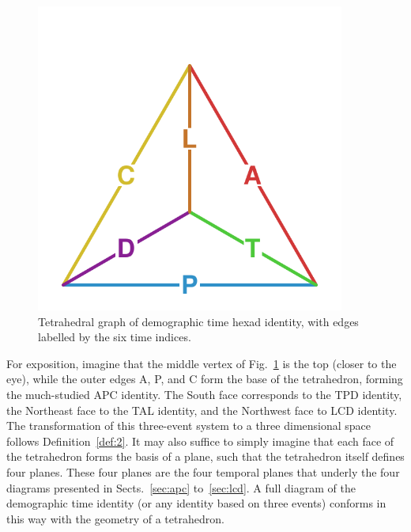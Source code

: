 \documentclass[12pt,oneside,a4paper]{article} %
\theoremstyle{definition}
\begin{document}
\begin{figure}[h!]
\centering
\caption{Tetrahedral graph of demographic time hexad identity, with edges
labelled by the six time indices.}
\label{fig:tet}
\includegraphics[width=4in]{Figures/TetraHedronEdgesOnly.pdf}%
\end{figure}

For exposition, imagine that the middle vertex of Fig.~\ref{fig:tet} is the
top (closer to the eye), while the outer edges A, P, and C form the
base of the tetrahedron, forming the much-studied APC identity.
The South face corresponds to the TPD identity,
the Northeast face to the TAL identity, and the
Northwest face to LCD identity. The transformation of this three-event
system to a three dimensional space follows Definition~\ref{def:2}.
It may also suffice to simply imagine that each face of the tetrahedron forms
the basis of a plane, such that the tetrahedron itself defines four planes. These four planes are the four temporal planes that underly
the four diagrams presented in Sects.~\ref{sec:apc} to~\ref{sec:lcd}. A full
diagram of the demographic time identity (or any identity based on three events)
conforms in this way with the geometry of a tetrahedron.
\end{document}
